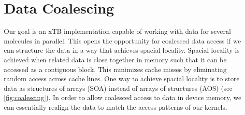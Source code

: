 \section{Data Coalescing}


Our goal is an xTB implementation capable of working with data for several molecules in parallel. This opens the opportunity for coalesced data access if we can structure the data in a way that achieves spacial locality. Spacial locality is achieved when related data is close together in memory such that it can be accessed as a contiguous block. This minimizes cache misses by eliminating random access across cache lines. One way to achieve spacial locality is to store data as structures of arrays (SOA) instead of arrays of structures (AOS) (see \autoref{fig:coalescing}). In order to allow coalesced access to data in device memory, we can essentially realign the data to match the access patterns of our kernels.%

